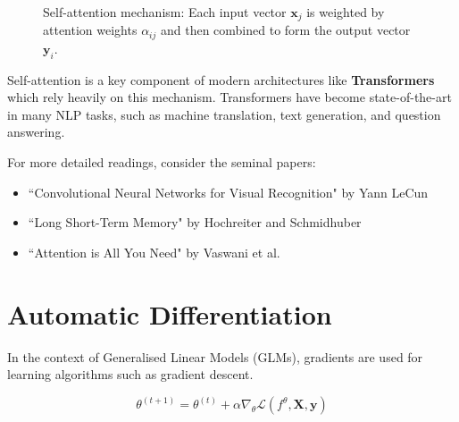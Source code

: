 \begin{figure}[h]
    \caption{Self-attention mechanism: Each input vector \( \bm{x}_j \) is weighted by attention weights \( \alpha_{ij} \) and then combined to form the output vector \( \bm{y}_i \).}
    \label{fig:attention}
\end{figure}


Self-attention is a key component of modern architectures like \textbf{Transformers} which rely heavily on this mechanism. Transformers have become state-of-the-art in many NLP tasks, such as machine translation, text generation, and question answering.


For more detailed readings, consider the seminal papers:
\begin{itemize}
    \item ``Convolutional Neural Networks for Visual Recognition" by Yann LeCun
    \item ``Long Short-Term Memory" by Hochreiter and Schmidhuber
    \item ``Attention is All You Need" by Vaswani et al.
\end{itemize}

\section{Automatic Differentiation}

In the context of Generalised Linear Models (GLMs), gradients are used for learning algorithms such as gradient descent.

\[\theta^{(t+1)}=\theta^{(t)}+\alpha\nabla_\theta\mathcal{L}(f^\theta,\bm{X},\bm{y})
\]

